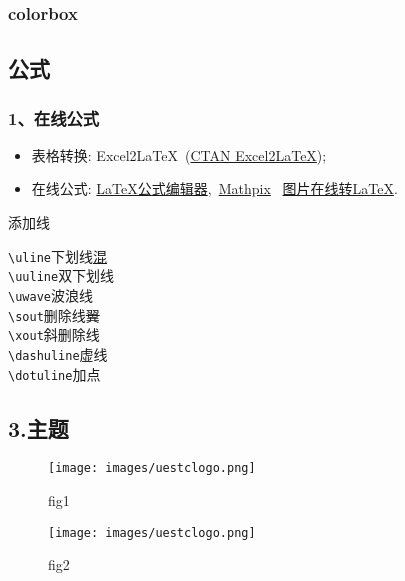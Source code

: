 \documentclass[12pt,hyperref,UTF8,aspectratio=169]{beamer}
\begin{document}
\begin{frame}
    \frametitle{colorbox}

\end{frame}


\subsection{公式}
\begin{frame}
    \frametitle{1、在线公式}

    \begin{itemize}
        \item<2-> 表格转换: Excel2\LaTeX~(\href{https://www.ctan.org/tex-archive/support/excel2latex/}{CTAN Excel2\LaTeX});
        \item<2-> 在线公式: \href{https://www.latexlive.com/}{LaTeX公式编辑器},~\href{https://mathpix.com/}{Mathpix}~ \href{https://mathf.itewqq.cn/}{图片在线转LaTeX}.
    \end{itemize}

\end{frame}

\begin{frame}[fragile]{添加线}
	\begin{multicols}{2}
		\verb|\uline|\hfill 下划线\qquad\uline{混}\\
		\verb|\uuline|\hfill 双下划线\qquad{}\\
		\verb|\uwave|\hfill 波浪线\qquad{}\\
		\verb|\sout|\hfill 删除线\qquad\sout{翼}\\
		\verb|\xout|\hfill 斜删除线\qquad{}\\
		\verb|\dashuline|\hfill 虚线\qquad{}\\
		\verb|\dotuline|\hfill 加点\qquad{}
	\end{multicols}
\end{frame}

\subsection{3.主题}

\begin{figure}
    \begin{minipage}[t]{0.5\linewidth}
    \centering
    \texttt{[image: images/uestclogo.png]}
    \caption{fig1}
    \label{fig:side:a}
    \end{minipage}%
    \begin{minipage}[t]{0.5\linewidth}
    \centering
    \texttt{[image: images/uestclogo.png]}
    \caption{fig2}
    \label{fig:side:b}
    \end{minipage}
\end{figure}
\end{document}
